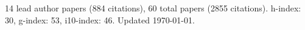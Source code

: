 14 lead author papers (884 citations),
60 total papers (2855 citations).\newline
h-index: 30, g-index: 53, i10-index: 46. Updated \today.